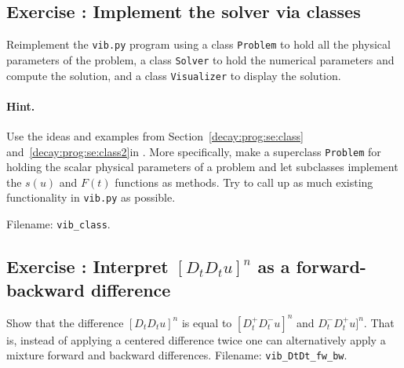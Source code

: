 \documentclass[%
oneside,                 %
final,                   %
10pt]{article}
\newenvironment{doconceexercise}{}{}
\newcounter{doconceexercisecounter}
\begin{document}
\begin{doconceexercise}

\subsection*{Exercise \thedoconceexercisecounter: Implement the solver via classes}

\label{vib:exer:gen:class}

Reimplement the \texttt{vib.py}
program
using a class \texttt{Problem} to hold all the physical parameters of the problem,
a class \texttt{Solver} to hold the numerical parameters and compute the
solution, and a class \texttt{Visualizer} to display the solution.


\paragraph{Hint.}
Use the ideas and examples
from Section~\ref{decay:prog:se:class} and~\ref{decay:prog:se:class2}in \cite{Langtangen_decay}.
More specifically, make a superclass \texttt{Problem} for holding the scalar
physical parameters of a problem and let subclasses implement the
$s(u)$ and $F(t)$ functions as methods.
Try to call up as much existing functionality in \texttt{vib.py} as possible.

\noindent Filename: \Verb!vib_class!.

\end{doconceexercise}




\begin{doconceexercise}

\subsection*{Exercise \thedoconceexercisecounter: Interpret $[D_tD_t u]^n$ as a forward-backward difference}

\label{vib:exer:DtDt:asDtpDtm}

Show that the difference $[D_t D_tu]^n$ is equal to $[D_t^+D_t^-u]^n$
and $D_t^-D_t^+u]^n$. That is, instead of applying a centered difference
twice one can alternatively apply a mixture forward and backward
differences.
\noindent Filename: \Verb!vib_DtDt_fw_bw!.

\end{doconceexercise}
\end{document}
